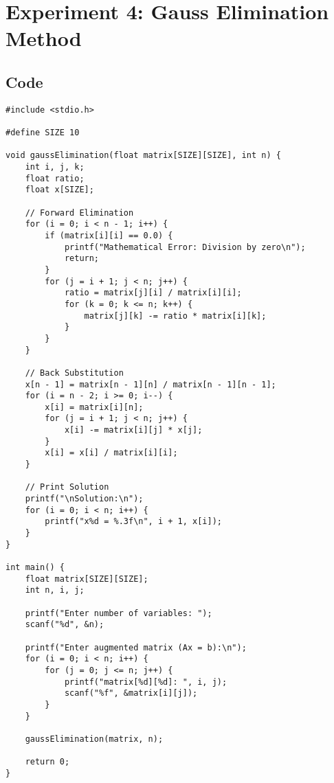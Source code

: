 \documentclass[12pt,a4paper]{article}
\begin{document}
\newpage
\section*{Experiment 4: Gauss Elimination Method}

\subsection*{Code}
\begin{lstlisting}
#include <stdio.h>

#define SIZE 10

void gaussElimination(float matrix[SIZE][SIZE], int n) {
    int i, j, k;
    float ratio;
    float x[SIZE];

    // Forward Elimination
    for (i = 0; i < n - 1; i++) {
        if (matrix[i][i] == 0.0) {
            printf("Mathematical Error: Division by zero\n");
            return;
        }
        for (j = i + 1; j < n; j++) {
            ratio = matrix[j][i] / matrix[i][i];
            for (k = 0; k <= n; k++) {
                matrix[j][k] -= ratio * matrix[i][k];
            }
        }
    }

    // Back Substitution
    x[n - 1] = matrix[n - 1][n] / matrix[n - 1][n - 1];
    for (i = n - 2; i >= 0; i--) {
        x[i] = matrix[i][n];
        for (j = i + 1; j < n; j++) {
            x[i] -= matrix[i][j] * x[j];
        }
        x[i] = x[i] / matrix[i][i];
    }

    // Print Solution
    printf("\nSolution:\n");
    for (i = 0; i < n; i++) {
        printf("x%d = %.3f\n", i + 1, x[i]);
    }
}

int main() {
    float matrix[SIZE][SIZE];
    int n, i, j;

    printf("Enter number of variables: ");
    scanf("%d", &n);

    printf("Enter augmented matrix (Ax = b):\n");
    for (i = 0; i < n; i++) {
        for (j = 0; j <= n; j++) {
            printf("matrix[%d][%d]: ", i, j);
            scanf("%f", &matrix[i][j]);
        }
    }

    gaussElimination(matrix, n);

    return 0;
}
\end{lstlisting}

\newpage
\end{document}

